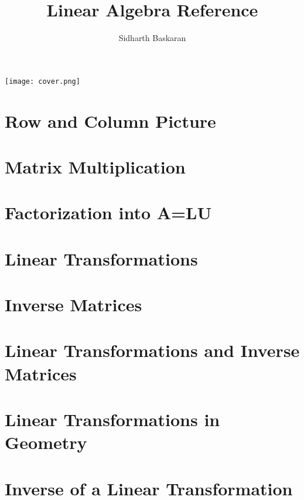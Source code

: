 \documentclass[11pt]{article}
\title{Linear Algebra Reference}
\author{Sidharth Baskaran}
\begin{document}
\maketitle

\begin{center}
    \texttt{[image: cover.png]}
\end{center}

\tableofcontents
\newpage

\section{Row and Column Picture}


\section{Matrix Multiplication}


\section{Factorization into A=LU}


\section{Linear Transformations}


\section{Inverse Matrices}


\section{Linear Transformations and Inverse Matrices}


\section{Linear Transformations in Geometry}


\section{Inverse of a Linear Transformation}

\end{document}
